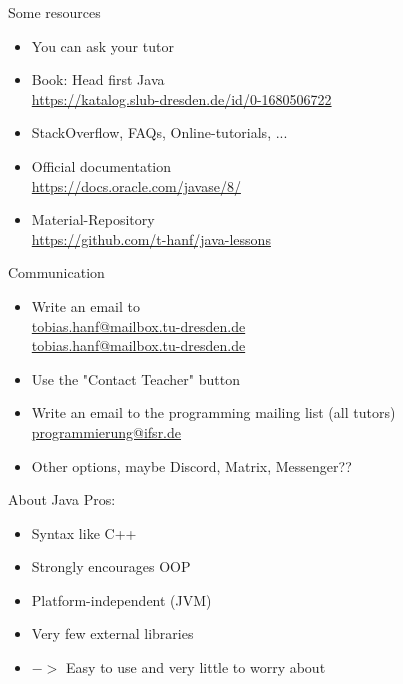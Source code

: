 \begin{frame}{Some resources}
	\begin{itemize}
		\item You can ask your tutor
		\item Book: Head first Java \\
			 \url{https://katalog.slub-dresden.de/id/0-1680506722}
		\item StackOverflow, FAQs, Online-tutorials, ... \hfill \\
		\item Official documentation \hfill \\
			\url{https://docs.oracle.com/javase/8/}
		\item Material-Repository \\
			\url{https://github.com/t-hanf/java-lessons}
	\end{itemize}
\end{frame}

\begin{frame}{Communication}
	\begin{itemize}
		\item Write an email to \\
			 \href{mailto:tobias.hanf@mailbox.tu-dresden.de}{tobias.hanf@mailbox.tu-dresden.de} \\
			 \href{mailto:tobias.hanf@mailbox.tu-dresden.de}{tobias.hanf@mailbox.tu-dresden.de}
	 	\item Use the "Contact Teacher" button
	 	\item Write an email to the programming mailing list (all tutors) \\
	 		\href{mailto:programmierung@ifsr.de}{programmierung@ifsr.de}
 		\item Other options, maybe Discord, Matrix, Messenger??
	 	
	\end{itemize}
\end{frame}

\begin{frame}{About Java}
	Pros:
	\begin{itemize}
		\item Syntax like C++
		\item Strongly encourages OOP
		\item Platform-independent (JVM)
		\item Very few external libraries
		\item[] $->$ Easy to use and very little to worry about
	\end{itemize}
\end{frame}

